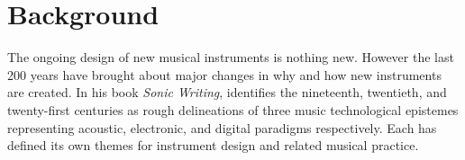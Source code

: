 \documentclass[letterpaper, 12pt]{article}
\begin{document}


\section{Background}
\label{ch3-sec:background}

The ongoing design of new musical instruments is nothing new. However the last 200 years have brought about major changes in why and how new instruments are created. In his book \emph{Sonic Writing}, \citet{Magnusson2019} identifies the nineteenth, twentieth, and twenty-first centuries as rough delineations of three music technological epistemes representing acoustic, electronic, and digital paradigms respectively. Each has defined its own themes for instrument design and related musical practice. 


\end{document}
